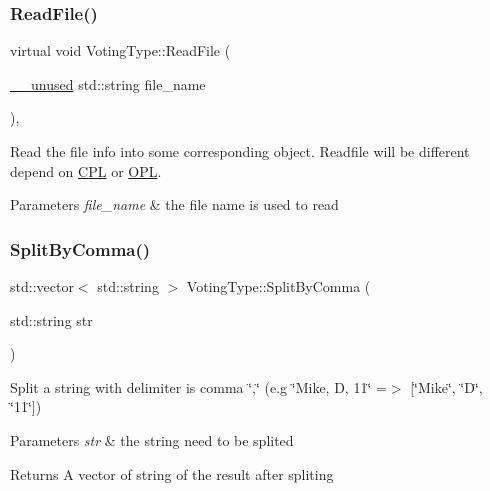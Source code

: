 \subsubsection{\texorpdfstring{Read\+File()}{ReadFile()}}
{\footnotesize\ttfamily virtual void Voting\+Type\+::\+Read\+File (\begin{DoxyParamCaption}\item[{\hyperlink{common_8h_a2e3484535ee610c8e19e9859563abe48}{\+\_\+\+\_\+unused} std\+::string}]{file\+\_\+name }\end{DoxyParamCaption})\hspace{0.3cm}{\ttfamily [inline]}, {\ttfamily [virtual]}}



Read the file info into some corresponding object. Readfile will be different depend on \hyperlink{classCPL}{C\+PL} or \hyperlink{classOPL}{O\+PL}. 


\begin{DoxyParams}{Parameters}
{\em file\+\_\+name} & the file name is used to read \\
\hline
\end{DoxyParams}
\mbox{\label{classVotingType_afd3cf8ddedcf5d5aae86b86eb8d3bdd0}} 
\subsubsection{\texorpdfstring{Split\+By\+Comma()}{SplitByComma()}}
{\footnotesize\ttfamily std\+::vector$<$ std\+::string $>$ Voting\+Type\+::\+Split\+By\+Comma (\begin{DoxyParamCaption}\item[{std\+::string}]{str }\end{DoxyParamCaption})}



Split a string with delimiter is comma \char`\"{},\char`\"{} (e.\+g \char`\"{}\+Mike, D, 11\char`\"{} =$>$ \mbox{[}\char`\"{}\+Mike\char`\"{}, \char`\"{}\+D\char`\"{}, \char`\"{}11\char`\"{}\mbox{]}) 


\begin{DoxyParams}{Parameters}
{\em str} & the string need to be splited\\
\hline
\end{DoxyParams}
\begin{DoxyReturn}{Returns}
A vector of string of the result after spliting 
\end{DoxyReturn}


